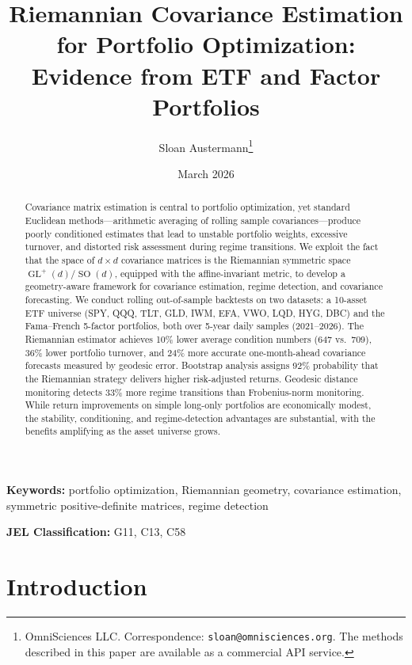 \documentclass[12pt,a4paper]{article}
\title{Riemannian Covariance Estimation for Portfolio Optimization:\\
Evidence from ETF and Factor Portfolios}
\author{Sloan Austermann\thanks{OmniSciences LLC. Correspondence: \texttt{sloan@omnisciences.org}. The methods described in this paper are available as a commercial API service.}}
\date{March 2026}
\DeclareMathOperator{\GL}{GL}
\DeclareMathOperator{\SO}{SO}
\begin{document}
\maketitle

\begin{abstract}
Covariance matrix estimation is central to portfolio optimization, yet standard
Euclidean methods---arithmetic averaging of rolling sample covariances---produce
poorly conditioned estimates that lead to unstable portfolio weights, excessive
turnover, and distorted risk assessment during regime transitions. We exploit the
fact that the space of $d \times d$ covariance matrices is the Riemannian
symmetric space $\GL^+(d)/\SO(d)$, equipped with the affine-invariant metric, to
develop a geometry-aware framework for covariance estimation, regime detection,
and covariance forecasting. We conduct rolling out-of-sample backtests on two
datasets: a 10-asset ETF universe (SPY, QQQ, TLT, GLD, IWM, EFA, VWO, LQD,
HYG, DBC) and the Fama--French 5-factor portfolios, both over 5-year daily
samples (2021--2026). The Riemannian estimator achieves 10\% lower average
condition numbers (647 vs.\ 709), 36\% lower portfolio turnover, and 24\% more
accurate one-month-ahead covariance forecasts measured by geodesic error.
Bootstrap analysis assigns 92\% probability that the Riemannian strategy delivers
higher risk-adjusted returns. Geodesic distance monitoring detects 33\% more
regime transitions than Frobenius-norm monitoring. While return improvements on
simple long-only portfolios are economically modest, the stability, conditioning,
and regime-detection advantages are substantial, with the benefits amplifying as
the asset universe grows.
\end{abstract}

\medskip
\noindent\textbf{Keywords:} portfolio optimization, Riemannian geometry, covariance estimation,
symmetric positive-definite matrices, regime detection

\noindent\textbf{JEL Classification:} G11, C13, C58

\newpage
\tableofcontents
\newpage

\section{Introduction}\label{sec:intro}
\end{document}
